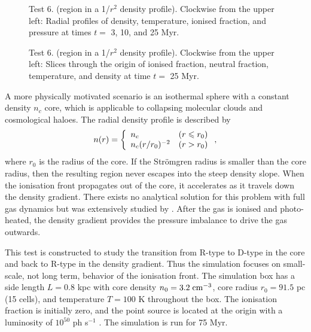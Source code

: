 \documentclass[useAMS,usenatbib]{mn2e}
\begin{document}
\begin{figure}
  \caption{\label{fig:test6_2} Test 6. (\hii region in a 1/$r^2$
    density profile).  Clockwise from the upper left: Radial profiles of
    density, temperature, ionised fraction, and pressure at times $t
    =$ 3, 10, and 25 Myr.}
\end{figure}

\begin{figure*}
  \caption{\label{fig:test6_3} Test 6. (\hii region in a 1/$r^2$
    density profile).  Clockwise from the upper left: Slices through the origin
    of ionised fraction, neutral fraction, temperature, and density at
    time $t =$ 25 Myr.}
\end{figure*}

A more physically motivated scenario is an isothermal sphere with a
constant density $n_c$ core, which is applicable to collapsing
molecular clouds and cosmological haloes.  The radial density profile
is described by
%
\begin{equation}
  \label{eqn:test6_rho}
  n(r) = \left\{ \begin{array}{l@{\quad}l}
      n_c & (r \le r_0)\\
      n_c (r/r_0)^{-2} & (r > r_0)
    \end{array} \right. ,
\end{equation}
where $r_0$ is the radius of the core.  If the Str\"{o}mgren radius is
smaller than the core radius, then the resulting \hii region
never escapes into the steep density slope.  When the ionisation front
propagates out of the core, it accelerates as it travels down the
density gradient.  There exists no analytical solution for this
problem with full gas dynamics but was extensively studied by
\citet{Franco90}.  After the gas is ionised and photo-heated, the
density gradient provides the pressure imbalance to drive the gas
outwards.

This test is constructed to study the transition from R-type to D-type
in the core and back to R-type in the density gradient.  Thus the
simulation focuses on small-scale, not long term, behavior of the
ionisation front.  The simulation box has a side length $L = 0.8$ kpc
with core density $n_0 = 3.2\;\cubecm$, core radius $r_0 = 91.5$ pc
(15 cells), and temperature $T = 100$ K throughout the box.  The
ionisation fraction is initially zero, and the point source is located
at the origin with a luminosity of $10^{50}$ ph s$^{-1}$ \cubecm.  The
simulation is run for 75 Myr.
\end{document}
